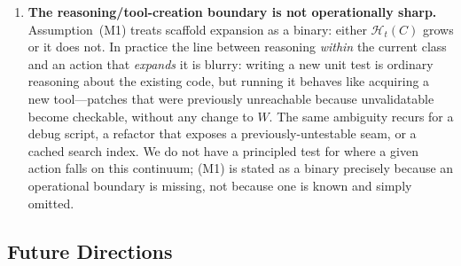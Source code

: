 \begin{enumerate}[leftmargin=*,itemsep=2pt]
    \item \textbf{The reasoning/tool-creation boundary is not operationally sharp.} Assumption~(M1) treats scaffold expansion as a binary: either $\mathcal{H}_t(C)$ grows or it does not. In practice the line between reasoning \emph{within} the current class and an action that \emph{expands} it is blurry: writing a new unit test is ordinary reasoning about the existing code, but running it behaves like acquiring a new tool---patches that were previously unreachable because unvalidatable become checkable, without any change to $W$. The same ambiguity recurs for a debug script, a refactor that exposes a previously-untestable seam, or a cached search index. We do not have a principled test for where a given action falls on this continuum; (M1) is stated as a binary precisely because an operational boundary is missing, not because one is known and simply omitted.
\end{enumerate}

\subsection{Future Directions}
\label{app:future}

